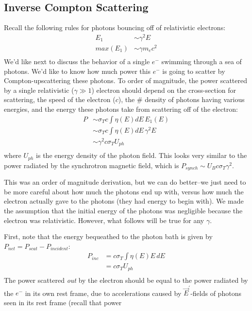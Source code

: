 \documentclass[11pt]{article}
\def\ef{\vec E}
\begin{document}
\subsection*{ Inverse Compton Scattering}

Recall the following rules for photons bouncing off of relativistic electrons:
$$\begin{aligned}E_1&\sim\gamma^2E\\ 
max(E_1)&\sim\gamma m_ec^2\\ \end{aligned}$$
We'd like next to discuss the behavior of a single $e^-$ swimming through a sea
of photons.  We'd like to know how much power this $e^-$ is going to scatter
by Compton-upscattering these photons.  To order of magnitude, the power
scattered by a single relativistic ($\gamma\gg1$) electron should depend on the 
cross-section for scattering, the speed of the electron ($c$), the \# density 
of photons having various energies, and the energy these photons take from
scattering off of the electron:
$$\begin{aligned}P&\sim\sigma_Tc\int{\eta(E)dE\,E_1(E)}\\ 
&\sim\sigma_Tc\int{\eta(E)dE\,\gamma^2E}\\ 
&\sim\gamma^2c\sigma_T U_{ph}\\ \end{aligned}$$
where $U_{ph}$ is the energy density of the photon field.  This looks very
similar to the power radiated by the synchrotron magnetic field, which is
$P_{synch}\sim U_Bc\sigma_T\gamma^2$.\par
This was an order of magnitude derivation, but we can do better--we just need
to be more careful about how much the photons end up with, versus how
much the electron actually gave to the photons (they had energy to begin with).
We made the assumption that the initial energy of the photons was negligible
because the electron was relativistic.  However, what follows will be true
for any $\gamma$.\par
First, note that the energy bequeathed to the photon bath is given by 
$P_{net}=P_{scat}-P_{incident}$:
$$\begin{aligned}P_{inc}&=c\sigma_T\int{\eta(E)E\,dE}\\ 
&=c\sigma_TU_{ph}\\ \end{aligned}$$
The power scattered {\it out} by the electron should be equal to the 
power radiated by the $e^-$ in its own rest frame, due to accelerations caused
by $\ef^\prime$-fields of photons seen in its rest frame (recall that power
\end{document}
